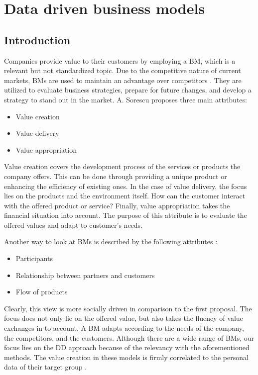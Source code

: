 \section{Data driven business models}
\label{s:DDBM}
\subsection{Introduction}


Companies provide value to their customers by employing a \gls{BM}, which is a relevant but not standardized topic. Due to the competitive nature of current markets, \gls{BM}s are used to maintain an advantage over competitors \cite{Hunke2017}. They are utilized to evaluate business strategies, prepare for future changes, and develop a strategy to stand out in the market.
A. Sorescu \cite{Sorescu2017} proposes three main attributes: 

\begin{itemize}
    \item Value creation
    \item Value delivery
    \item Value appropriation
\end{itemize}

Value creation covers the development process of the services or products the company offers. This can be done through providing a unique product or enhancing the efficiency of existing ones. 
In the case of value delivery, the focus lies on the products and the environment itself. How can the customer interact with the offered product or service?
Finally, value appropriation takes the financial situation into account. The purpose of this attribute is to evaluate the offered values and adapt to customer's needs. 

Another way to look at \gls{BM}s is described by the following attributes \cite{Zott2011}:

\begin{itemize}
    \item Participants
    \item Relationship between partners and customers
    \item Flow of products 
\end{itemize}

Clearly, this view is more socially driven in comparison to the first proposal. The focus does not only lie on the offered value, but also takes the fluency of value exchanges in to account.  
A \gls{BM} adapts according to the needs of the company, the competitors, and the customers. 
Although there are a wide range of \gls{BM}s, our focus lies on the \gls{DD} approach because of the relevancy with the aforementioned methods. The value creation in these models is firmly correlated to the personal data of their target group \cite{Zott2011}.

